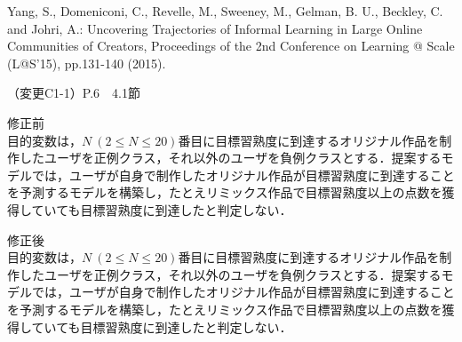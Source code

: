 \documentclass{jarticle} %
\newcommand{\todo}[1]{\colorbox{yellow}{{\bf TODO}:}{\color{red}{\textbf{[#1]}}}}
\def\subsection#1{ \vspace{1pc} {\gt #1} }
\begin{document}
\noindent[回答書引用3] Yang, S., Domeniconi, C., Revelle, M., Sweeney, M., Gelman, B. U., Beckley, C. and Johri, A.: Uncovering Trajectories of Informal Learning in Large Online Communities of Creators, Proceedings of the 2nd Conference on Learning @ Scale (L@S'15), pp.131-140 (2015).

\newpage
\subsection{（変更C1-1）P.6　4.1節}
\vspace{-0.3cm}
\begin{description}
\item 修正前\\
\phantom{　}
目的変数は，{$N~(2 \leq N \leq 20)$}番目に目標習熟度に到達するオリジナル作品を制作したユーザを正例クラス，それ以外のユーザを負例クラスとする．提案するモデルでは，ユーザが自身で制作したオリジナル作品が目標習熟度に到達することを予測するモデルを構築し，たとえリミックス作品で目標習熟度以上の点数を獲得していても目標習熟度に到達したと判定しない．
\vspace{-0.3cm}
\item 修正後\\
\phantom{　}
目的変数は，{$N~(2 \leq N \leq 20)$}番目に目標習熟度に到達するオリジナル作品を制作したユーザを正例クラス，それ以外のユーザを負例クラスとする．\textcolor{red}{}提案するモデルでは，ユーザが自身で制作したオリジナル作品が目標習熟度に到達することを予測するモデルを構築し，たとえリミックス作品で目標習熟度以上の点数を獲得していても目標習熟度に到達したと判定しない．
\end{description}
\end{document}
